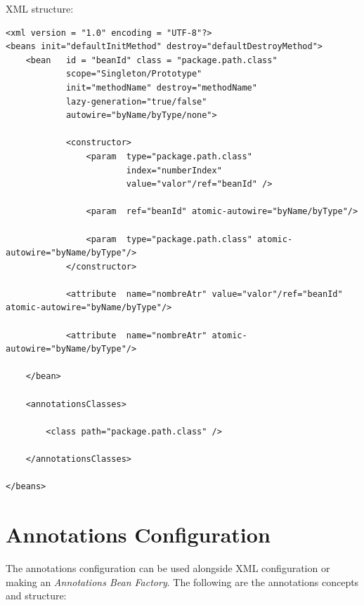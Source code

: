 \documentclass[a4paper, 12pt, notitlepage]{report}
\begin{document}
\newpage
XML structure:
\begin{lstlisting}[numbers = none,]
<xml version = "1.0" encoding = "UTF-8"?>
<beans init="defaultInitMethod" destroy="defaultDestroyMethod">
    <bean   id = "beanId" class = "package.path.class" 
            scope="Singleton/Prototype" 
            init="methodName" destroy="methodName" 
            lazy-generation="true/false" 
            autowire="byName/byType/none">

            <constructor>
                <param  type="package.path.class" 
                        index="numberIndex" 
                        value="valor"/ref="beanId" />
                        
                <param  ref="beanId" atomic-autowire="byName/byType"/>
                
                <param  type="package.path.class" atomic-autowire="byName/byType"/>                        
            </constructor>

            <attribute  name="nombreAtr" value="valor"/ref="beanId" atomic-autowire="byName/byType"/>
            
            <attribute  name="nombreAtr" atomic-autowire="byName/byType"/>          

    </bean>
    
    <annotationsClasses> 
    
        <class path="package.path.class" /> 
    
    </annotationsClasses>
    
</beans>
\end{lstlisting}

\newpage
\section{Annotations Configuration}

The annotations configuration can be used alongside XML configuration or making an \textit{Annotations Bean Factory}. The following are the annotations concepts and structure:
\end{document}
